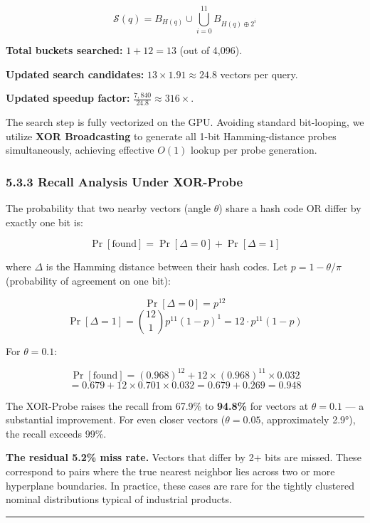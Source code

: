 \[\mathcal{S}(q) = B_{H(q)} \cup \bigcup_{i=0}^{11} B_{H(q) \oplus 2^i}\]

\textbf{Total buckets searched:} \(1 + 12 = 13\) (out of 4,096).

\textbf{Updated search candidates:} \(13 \times 1.91 \approx 24.8\) vectors per query.

\textbf{Updated speedup factor:} \(\frac{7{,}840}{24.8} \approx 316\times\).

The search step is fully vectorized on the GPU. Avoiding standard bit-looping, we utilize \textbf{XOR Broadcasting} to generate all 1-bit Hamming-distance probes simultaneously, achieving effective \(O(1)\) lookup per probe generation.

\subsubsection{5.3.3 Recall Analysis Under XOR-Probe}\label{recall-analysis-under-xor-probe}

The probability that two nearby vectors (angle \(\theta\)) share a hash code OR differ by exactly one bit is:

\[\Pr[\text{found}] = \Pr[\Delta = 0] + \Pr[\Delta = 1]\]

where \(\Delta\) is the Hamming distance between their hash codes. Let \(p = 1 - \theta/\pi\) (probability of agreement on one bit):

\[\Pr[\Delta = 0] = p^{12}\] \[\Pr[\Delta = 1] = \binom{12}{1} p^{11}(1-p)^1 = 12 \cdot p^{11}(1-p)\]

For \(\theta = 0.1\):

\[\Pr[\text{found}] = (0.968)^{12} + 12 \times (0.968)^{11} \times 0.032\] \[= 0.679 + 12 \times 0.701 \times 0.032 = 0.679 + 0.269 = 0.948\]

The XOR-Probe raises the recall from 67.9\% to \textbf{94.8\%} for vectors at \(\theta = 0.1\) --- a substantial improvement. For even closer vectors (\(\theta = 0.05\), approximately 2.9°), the recall exceeds 99\%.

\textbf{The residual 5.2\% miss rate.} Vectors that differ by 2+ bits are missed. These correspond to pairs where the true nearest neighbor lies across two or more hyperplane boundaries. In practice, these cases are rare for the tightly clustered nominal distributions typical of industrial products.

\begin{center}\rule{0.5\linewidth}{0.5pt}\end{center}

